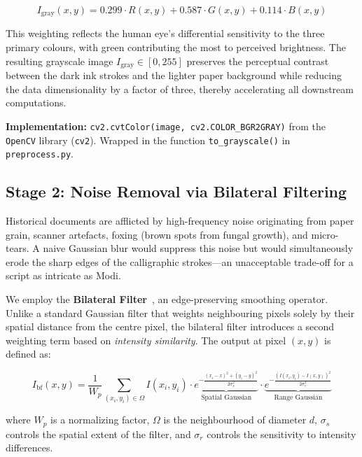 \documentclass[12pt, a4paper]{article}
\begin{document}
\begin{equation}
    I_{\text{gray}}(x,y) = 0.299 \cdot R(x,y) + 0.587 \cdot G(x,y) + 0.114 \cdot B(x,y)
    \label{eq:grayscale}
\end{equation}

This weighting reflects the human eye's differential sensitivity to the three primary colours, with green contributing the most to perceived brightness. The resulting grayscale image $I_{\text{gray}} \in [0, 255]$ preserves the perceptual contrast between the dark ink strokes and the lighter paper background while reducing the data dimensionality by a factor of three, thereby accelerating all downstream computations.

\textbf{Implementation:} \texttt{cv2.cvtColor(image, cv2.COLOR\_BGR2GRAY)} from the \texttt{OpenCV} library (\texttt{cv2}). Wrapped in the function \texttt{to\_grayscale()} in \texttt{preprocess.py}.


\subsection{Stage 2: Noise Removal via Bilateral Filtering}

Historical documents are afflicted by high-frequency noise originating from paper grain, scanner artefacts, foxing (brown spots from fungal growth), and micro-tears. A naive Gaussian blur would suppress this noise but would simultaneously erode the sharp edges of the calligraphic strokes---an unacceptable trade-off for a script as intricate as Modi.

We employ the \textbf{Bilateral Filter}~\cite{tomasi1998}, an edge-preserving smoothing operator. Unlike a standard Gaussian filter that weights neighbouring pixels solely by their spatial distance from the centre pixel, the bilateral filter introduces a second weighting term based on \emph{intensity similarity}. The output at pixel $(x,y)$ is defined as:

\begin{equation}
    I_{\text{bf}}(x,y) = \frac{1}{W_p} \sum_{(x_i, y_i) \in \Omega} I(x_i, y_i) \cdot \underbrace{e^{-\frac{(x_i - x)^2 + (y_i - y)^2}{2\sigma_s^2}}}_{\text{Spatial Gaussian}} \cdot \underbrace{e^{-\frac{(I(x_i,y_i) - I(x,y))^2}{2\sigma_r^2}}}_{\text{Range Gaussian}}
    \label{eq:bilateral}
\end{equation}

where $W_p$ is a normalizing factor, $\Omega$ is the neighbourhood of diameter $d$, $\sigma_s$ controls the spatial extent of the filter, and $\sigma_r$ controls the sensitivity to intensity differences.
\end{document}
